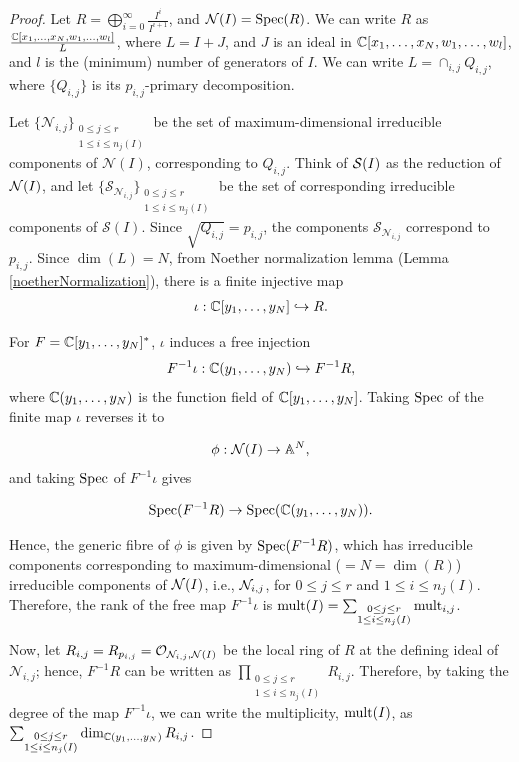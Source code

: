 \documentclass[11pt,a4paper,leqno,noamsfonts]{amsart}
\numberwithin{equation}{section}
\begin{document}
\begin{proof}

Let $R=\bigoplus_{i=0}^{\infty}\frac{I^i}{I^{i+1}}$, and ${\mathcal{N}(I)}=\operatorname{Spec} (R)$.
We can write $R$ as $\frac{{\mathbb{C}}[x_1,\ldots,x_N,w_1,\ldots,w_l]}{L}$, where $L=I+J$, and $J$ is an ideal in ${\mathbb{C}}[x_1,\ldots,x_N,w_1,\ldots,w_l]$, and $l$ is the (minimum) number of generators of $I$. We can write $L=\cap_{i,j} Q_{i,j}$, where $\{Q_{i,j}\}$ is its $p_{i,j}$-primary decomposition. 

Let $\{\mathcal{N}_{i,j}\}_{\substack{0\leq j \leq r\\1\leq i \leq n_j(I)}}$ be the set of maximum-dimensional irreducible components of ${\mathcal{N}(I)}$, corresponding to $Q_{i,j}$. Think of ${\mathcal S}(I)$ as the reduction of ${\mathcal N}(I)$, and let  $\{\mathcal{S}_{\mathcal{N}_{i,j}}\}_{\substack{0\leq j \leq r\\1\leq i \leq n_j(I)}}$ be the set of corresponding irreducible components of  $\mathcal{S}(I)$. Since $\sqrt{Q_{i,j}}=p_{i,j}$, the components $\mathcal{S}_{\mathcal{N}_{i,j}}$ correspond to $p_{i,j}$.
Since $\dim(L)=N$, from Noether normalization lemma (Lemma \ref{noetherNormalization}), there is a finite injective map 
\begin{align}\label{eq:iota}
    \iota:{\mathbb{C}}[y_1,\ldots,y_N]\hookrightarrow R.
\end{align}
 

For $F={\mathbb{C}}[y_1,\ldots,y_N]^{*}$, $\iota$ induces a free injection 
\begin{align}\label{eq:FinverseIota}
    F^{-1}\iota: {\mathbb{C}}(y_1,\ldots,y_N) \hookrightarrow F^{-1}R,
\end{align}
where ${\mathbb{C}}(y_1,\ldots,y_N)$ is the function field of ${\mathbb{C}}[y_1,\ldots,y_N]$. Taking $\operatorname{Spec}$ of the finite map $\iota$ reverses it to 

$$\phi:{\mathcal N}(I)\to {\mathbb{A}}^N,$$
and taking $\operatorname{Spec}$ of $F^{-1}\iota$ gives 

$$\operatorname{Spec}(F^{-1}R)\to\operatorname{Spec}({\mathbb{C}}(y_1,\ldots,y_N)).$$ 

 Hence, the generic fibre of $\phi$  is given by $\operatorname{Spec}(F^{-1}R)$, which has irreducible components corresponding to maximum-dimensional ($=N=\dim(R)$) irreducible components of ${\mathcal N}(I)$, i.e., ${\mathcal N}_{i,j}$, for $0\leq j \leq r$ and $1\leq i \leq n_j(I)$.  
Therefore, the rank of the free map $F^{-1}\iota$ is $\mathrm{mult}(I)=\sum_{\substack{0\leq j \leq r\\1\leq i \leq n_j(I)}}\mathrm{mult}_{i,j}$.

Now, let $R_{i,j}=R_{p_{i,j}}={\mathcal O}_{{\mathcal N}_{i,j},{\mathcal N}(I)}$ be the local ring of $R$ at the defining ideal of $\mathcal{N}_{i,j}$; hence, $F^{-1}R$ can be written as $\prod_{\substack{0\leq j \leq r\\1\leq i \leq n_j(I)}}R_{i,j}$. 
Therefore, by taking the degree of the map $F^{-1}\iota$, we can write the multiplicity, $\mathrm{mult}(I)$, as $\sum_{\substack{0\leq j \leq r\\1\leq i \leq n_j(I)}}\dim_{{\mathbb{C}}(y_1,\ldots,y_N)}R_{i,j}$.



\end{proof}
\end{document}

